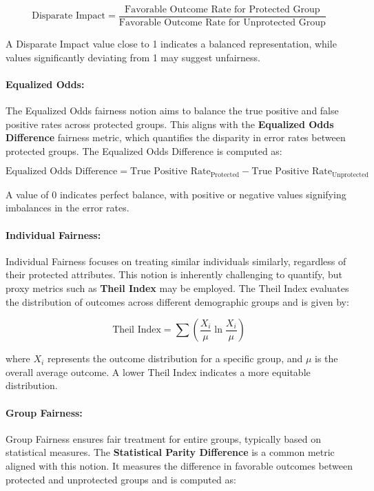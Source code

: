 \[
\text{Disparate Impact} = \frac{\text{Favorable Outcome Rate for Protected Group}}{\text{Favorable Outcome Rate for Unprotected Group}}
\]

A Disparate Impact value close to 1 indicates a balanced representation, while values significantly deviating from 1 may suggest unfairness.

\paragraph{Equalized Odds:}

The Equalized Odds fairness notion aims to balance the true positive and false positive rates across protected groups. This aligns with the \textbf{Equalized Odds Difference} fairness metric, which quantifies the disparity in error rates between protected groups. The Equalized Odds Difference is computed as:

\[
\text{Equalized Odds Difference} = \text{True Positive Rate}_{\text{Protected}} - \text{True Positive Rate}_{\text{Unprotected}}
\]

A value of 0 indicates perfect balance, with positive or negative values signifying imbalances in the error rates.

\paragraph{Individual Fairness:}

Individual Fairness focuses on treating similar individuals similarly, regardless of their protected attributes. This notion is inherently challenging to quantify, but proxy metrics such as \textbf{Theil Index} may be employed. The Theil Index evaluates the distribution of outcomes across different demographic groups and is given by:

\[
\text{Theil Index} = \sum \left( \frac{X_{i}}{\mu} \ln \frac{X_{i}}{\mu} \right)
\]

where \(X_{i}\) represents the outcome distribution for a specific group, and \(\mu\) is the overall average outcome. A lower Theil Index indicates a more equitable distribution.

\paragraph{Group Fairness:}

Group Fairness ensures fair treatment for entire groups, typically based on statistical measures. The \textbf{Statistical Parity Difference} is a common metric aligned with this notion. It measures the difference in favorable outcomes between protected and unprotected groups and is computed as:


